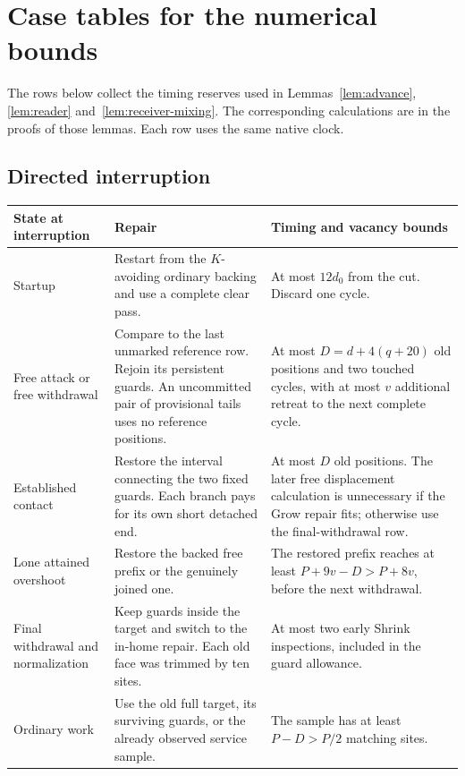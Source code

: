 \section{Case tables for the numerical bounds}\label{sec:case-tables}

The rows below collect the timing reserves used in Lemmas~\ref{lem:advance}, \ref{lem:reader} and~\ref{lem:receiver-mixing}. The corresponding calculations are in the proofs of those lemmas. Each row uses the same native clock.

\subsection{Directed interruption}

\begin{longtable}{@{}>{\raggedright\arraybackslash}p{.25\linewidth}>{\raggedright\arraybackslash}p{.38\linewidth}>{\raggedright\arraybackslash}p{.28\linewidth}@{}}
\toprule
State at interruption & Repair & Timing and vacancy bounds \\
\midrule
\endhead
Startup & Restart from the \(K\)-avoiding ordinary backing and use a complete clear pass. & At most \(12d_0\) from the cut. Discard one cycle. \\
Free attack or free withdrawal & Compare to the last unmarked reference row. Rejoin its persistent guards. An uncommitted pair of provisional tails uses no reference positions. & At most \(D=d+4(q+20)\) old positions and two touched cycles, with at most \(v\) additional retreat to the next complete cycle. \\
Established contact & Restore the interval connecting the two fixed guards. Each branch pays for its own short detached end. & At most \(D\) old positions. The later free displacement calculation is unnecessary if the Grow repair fits; otherwise use the final-withdrawal row. \\
Lone attained overshoot & Restore the backed free prefix or the genuinely joined one. & The restored prefix reaches at least \(P+9v-D>P+8v\), before the next withdrawal. \\
Final withdrawal and normalization & Keep guards inside the target and switch to the in-home repair. Each old face was trimmed by ten sites. & At most two early Shrink inspections, included in the guard allowance. \\
Ordinary work & Use the old full target, its surviving guards, or the already observed service sample. & The sample has at least \(P-D>P/2\) matching sites. \\
\bottomrule
\end{longtable}

